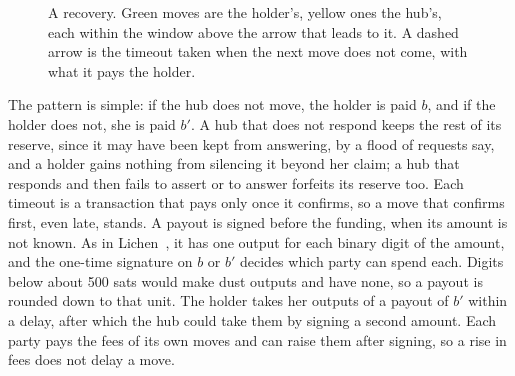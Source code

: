 \documentclass[11pt]{article}
\newcommand{\wH}{w_H}
\newcommand{\wA}{w_A}
\newcommand{\wC}{w_C}
\newcommand{\wX}{w_X}
\newcommand{\bresp}{b'}
\begin{document}
\begin{figure}[htb]
\centering
{}
\caption{A recovery. Green moves are the holder's, yellow ones the hub's, each within the window above the arrow that leads to it. A dashed arrow is the timeout taken when the next move does not come, with what it pays the holder.}
\label{fig:dispute}
\end{figure}

The pattern is simple: if the hub does not move, the holder is paid $b$, and if the holder does not, she is paid $\bresp$. A hub that does not respond keeps the rest of its reserve, since it may have been kept from answering, by a flood of requests say, and a holder gains nothing from silencing it beyond her claim; a hub that responds and then fails to assert or to answer forfeits its reserve too. Each timeout is a transaction that pays only once it confirms, so a move that confirms first, even late, stands. A payout is signed before the funding, when its amount is not known. As in Lichen~\cite[Section~5.2]{lichen}, it has one output for each binary digit of the amount, and the one-time signature on $b$ or $\bresp$ decides which party can spend each. Digits below about 500 sats would make dust outputs and have none, so a payout is rounded down to that unit. The holder takes her outputs of a payout of $\bresp$ within a delay, after which the hub could take them by signing a second amount. Each party pays the fees of its own moves and can raise them after signing, so a rise in fees does not delay a move.
\end{document}
